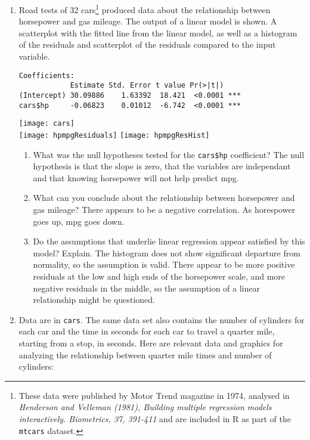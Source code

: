 \documentclass[12pt,fullpage]{amsart}
\begin{document}
\begin{enumerate}
\vfill
  
\newpage
  
\item Road tests of 32 cars\footnote{These data were published by Motor Trend magazine in 1974, analysed in \emph{Henderson and Velleman (1981), Building multiple regression models interactively. Biometrics, 37, 391-411} and are included in R as part of the \texttt{mtcars} dataset.} produced data about the relationship between horsepower and gas mileage. The output of a linear model is shown. A scatterplot with the fitted line from the linear model, as well as a histogram of the residuals and scatterplot of the residuals compared to the input variable.
\begin{verbatim}
Coefficients:
            Estimate Std. Error t value Pr(>|t|)    
(Intercept) 30.09886    1.63392  18.421  <0.0001 ***
cars$hp     -0.06823    0.01012  -6.742  <0.0001 ***
\end{verbatim}

\begin{center}
  \texttt{[image: cars]}\\
  \texttt{[image: hpmpgResiduals]}\quad
  \texttt{[image: hpmpgResHist]}
\end{center}

  \begin{enumerate}
  \item What was the null hypotheses tested for the \texttt{cars\$hp} coefficient?
{\color{red} The null hypothesis is that the slope is zero, that the variables are independant and that knowing horsepower will not help predict mpg.}
  \item What can you conclude about the relationship between horsepower and gas mileage?
{\color{red} There appears to be a negative correlation. As horespower goes up, mpg goes down.}
\item Do the assumptions that underlie linear regression appear satisfied by this model? Explain.
{\color{red} The histogram does not show significant departure from normality, so the assumption is valid.  There appear to be more positive residuals at the low and high ends of the horsepower scale, and more negative residuals in the middle, so the assumption of a linear relationship might be questioned.}
  
  \end{enumerate}

  \vfill

\item Data are in \texttt{cars}. The same data set also contains the number of cylinders for each car and the time in seconds for each car to travel a quarter mile, starting from a stop, in seconds. Here are relevant data and graphics for analyzing the relationship between quarter mile times and number of cylinders:
  

\end{enumerate}
\end{document}
